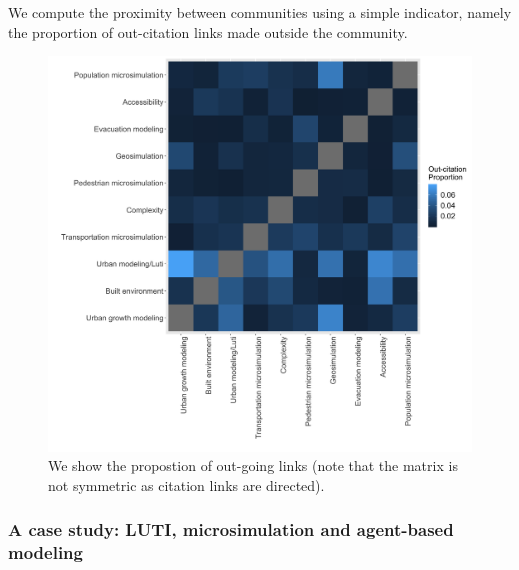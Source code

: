 
We compute the proximity between communities using a simple indicator, namely the proportion of out-citation links made outside the community.


\begin{figure}
	\centering
	\includegraphics[width=\linewidth]{figures/com_intercit_proportion.png}
	\caption{ We show the propostion of out-going links (note that the matrix is not symmetric as citation links are directed).}
	\label{fig:outcitprop}
\end{figure}













\subsubsection*{A case study: LUTI, microsimulation and agent-based modeling}

